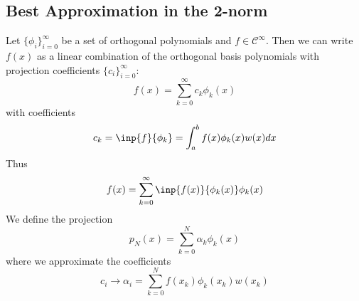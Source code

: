 \documentclass[12pt]{article}
\theoremstyle{definition}
\theoremstyle{definition}
\begin{document}
\subsection{Best Approximation in the 2-norm}
Let $\{\phi_i\}_{i=0}^\infty$ be a set of orthogonal polynomials and $f \in \mathcal{C}^\infty$. Then we can write $f(x)$ as a linear combination of the orthogonal basis polynomials with projection coefficients $\{c_i\}_{i=0}^\infty$:
\begin{equation}
	f(x) = \sum_{k=0}^\infty c_k \phi_k(x)
\end{equation}
with coefficients
\begin{equation}
	c_k = \inp{f}{\phi_k} = \int_a^b f(x)\phi_k(x) w(x) dx
\end{equation}
Thus
\begin{equation}
	f(x) = \sum_{k=0}^\infty \inp{f(x)}{\phi_k(x)} \phi_k(x)
\end{equation}
We define the projection
\begin{equation}
	p_N(x) = \sum_{k=0}^N \alpha_k \phi_k(x)
\end{equation}
where we approximate the coefficients
\begin{equation}
	c_i \to \alpha_i = \sum_{k=0}^N f(x_k)\phi_k(x_k) w(x_k)
\end{equation}
\end{document}
